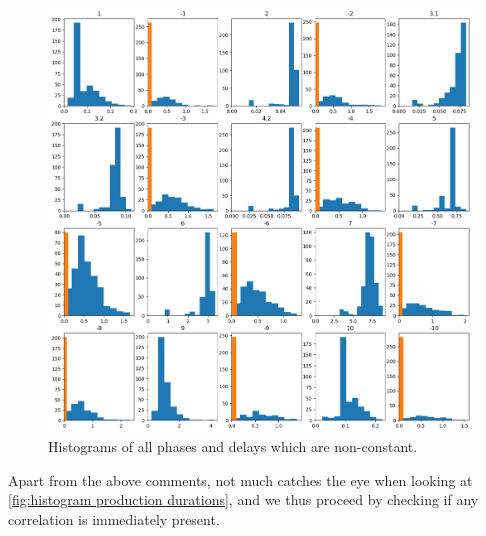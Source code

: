 \documentclass[../Thesis.tex]{subfiles}
\begin{document}
\begin{figure}[H]
    \centering
    \includegraphics[width=\linewidth]{figures/Multiple cycles data/Adding of solids/hisstograms w atoms.png}
    \caption{Histograms of all phases and delays which are non-constant.}
    \label{fig:histogram production durations}
\end{figure}

Apart from the above comments, not much catches the eye when looking at \autoref{fig:histogram production durations}, and we thus proceed by checking if any correlation is immediately present.
\end{document}
